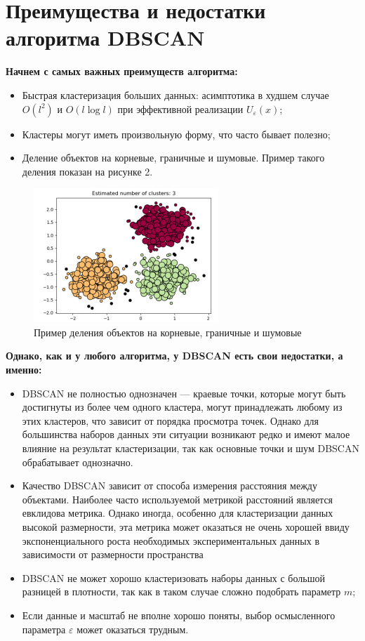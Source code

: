 \section*{Преимущества и недостатки алгоритма DBSCAN}
\textbf{Начнем с самых важных преимуществ алгоритма:}
\begin{itemize}
    \item Быстрая кластеризация больших данных: асимптотика в худшем случае $O(l^2)$ и $O(l \log l)$ при эффективной реализации $U_{\varepsilon}(x)$;
    \item Кластеры могут иметь произвольную форму, что часто бывает полезно;
    \item Деление объектов на корневые, граничные и шумовые. Пример такого деления показан на рисунке 2.
\end{itemize}
\begin{figure}[h]
    \centering
    \includegraphics[width=0.47\linewidth]{clusters.png}
    \caption{Пример деления объектов на корневые, граничные и шумовые}
    \label{fig:enter-label}
\end{figure}
\textbf{Однако, как и у любого алгоритма, у DBSCAN есть свои недостатки, а именно:}
\begin{itemize}
    \item DBSCAN не полностью однозначен — краевые точки, которые могут быть достигнуты из более чем одного кластера, могут принадлежать любому из этих кластеров, что зависит от порядка просмотра точек. Однако для большинства наборов данных эти ситуации возникают редко и имеют малое влияние на результат кластеризации, так как основные точки и шум DBSCAN обрабатывает однозначно.
    \item Качество DBSCAN зависит от способа измерения расстояния между объектами. Наиболее часто используемой метрикой расстояний является евклидова метрика. Однако иногда, особенно для кластеризации данных высокой размерности, эта метрика может оказаться не очень хорошей ввиду экспоненциального роста необходимых экспериментальных данных в зависимости от размерности пространства
    \item DBSCAN не может хорошо кластеризовать наборы данных с большой разницей в плотности, так как в таком случае сложно подобрать параметр $m$;
    \item Если данные и масштаб не вполне хорошо поняты, выбор осмысленного параметра $\varepsilon$ может оказаться трудным.
\end{itemize}
